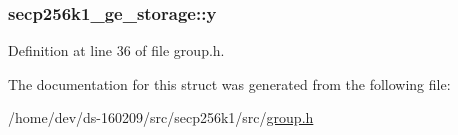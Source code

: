 \subsubsection[{y}]{ secp256k1\+\_\+ge\+\_\+storage\+::y}\label{structsecp256k1__ge__storage_af0b13f3e06135a94484cc6f6dd4ef3cc}


Definition at line 36 of file group.\+h.



The documentation for this struct was generated from the following file\+:\begin{DoxyCompactItemize}
\item 
/home/dev/ds-\/160209/src/secp256k1/src/\hyperlink{group_8h}{group.\+h}\end{DoxyCompactItemize}
